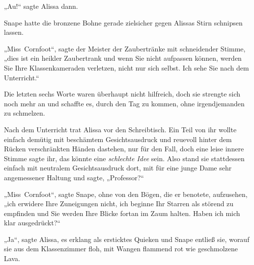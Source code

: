 „Au!“ sagte Alissa dann.

Snape hatte die bronzene Bohne gerade zielsicher gegen Alissas Stirn schnipsen lassen.

„Miss~Cornfoot“, sagte der Meister der Zaubertränke mit schneidender Stimme, „dies ist ein heikler Zaubertrank und wenn Sie nicht aufpassen können, werden Sie Ihre Klassenkameraden verletzen, nicht nur sich selbst. Ich sehe Sie nach dem Unterricht.“

Die letzten sechs Worte waren überhaupt nicht hilfreich, doch sie strengte sich noch mehr an und schaffte es, durch den Tag zu kommen, ohne irgendjemanden zu schmelzen.

Nach dem Unterricht trat Alissa vor den Schreibtisch. Ein Teil von ihr wollte einfach demütig mit beschämtem Gesichtsausdruck und reuevoll hinter dem Rücken verschränkten Händen dastehen, nur für den Fall, doch eine leise innere Stimme sagte ihr, das könnte eine \emph{schlechte Idee} sein. Also stand sie stattdessen einfach mit neutralem Gesichtsausdruck dort, mit für eine junge Dame sehr angemessener Haltung und sagte, „Professor?“

„Miss~Cornfoot“, sagte Snape, ohne von den Bögen, die er benotete, aufzusehen, „ich erwidere Ihre Zuneigungen nicht, ich beginne Ihr Starren als störend zu empfinden und Sie werden Ihre Blicke fortan im Zaum halten. Haben ich mich klar ausgedrückt?“

„Ja“, sagte Alissa, es erklang als ersticktes Quieken und Snape entließ sie, worauf sie aus dem Klassenzimmer floh, mit Wangen flammend rot wie geschmolzene Lava.%

